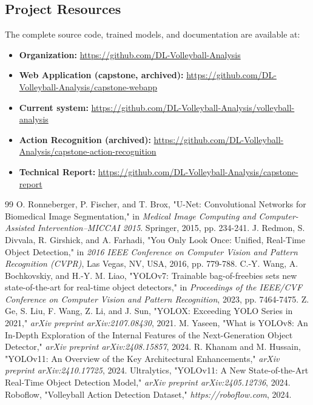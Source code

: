 \documentclass[journal]{IEEEtran}
\begin{document}
\subsection{Project Resources}
The complete source code, trained models, and documentation are available at:
\begin{itemize}
\item \textbf{Organization:} \url{https://github.com/DL-Volleyball-Analysis}
\item \textbf{Web Application (capstone, archived):} \url{https://github.com/DL-Volleyball-Analysis/capstone-webapp}
\item \textbf{Current system:} \url{https://github.com/DL-Volleyball-Analysis/volleyball-analysis}
\item \textbf{Action Recognition (archived):} \url{https://github.com/DL-Volleyball-Analysis/capstone-action-recognition}
\item \textbf{Technical Report:} \url{https://github.com/DL-Volleyball-Analysis/capstone-report}
\end{itemize}

\vspace{0.5cm}

\begin{minipage}[t]{0.48\textwidth}
\begin{thebibliography}{99}
     O. Ronneberger, P. Fischer, and T. Brox, "U-Net: Convolutional Networks for Biomedical Image Segmentation," in \textit{Medical Image Computing and Computer-Assisted Intervention–MICCAI 2015}. Springer, 2015, pp. 234-241.
     J. Redmon, S. Divvala, R. Girshick, and A. Farhadi, "You Only Look Once: Unified, Real-Time Object Detection," in \textit{2016 IEEE Conference on Computer Vision and Pattern Recognition (CVPR)}, Las Vegas, NV, USA, 2016, pp. 779-788.
     C.-Y. Wang, A. Bochkovskiy, and H.-Y. M. Liao, "YOLOv7: Trainable bag-of-freebies sets new state-of-the-art for real-time object detectors," in \textit{Proceedings of the IEEE/CVF Conference on Computer Vision and Pattern Recognition}, 2023, pp. 7464-7475.
     Z. Ge, S. Liu, F. Wang, Z. Li, and J. Sun, "YOLOX: Exceeding YOLO Series in 2021," \textit{arXiv preprint arXiv:2107.08430}, 2021.
     M. Yaseen, "What is YOLOv8: An In-Depth Exploration of the Internal Features of the Next-Generation Object Detector," \textit{arXiv preprint arXiv:2408.15857}, 2024.
     R. Khanam and M. Hussain, "YOLOv11: An Overview of the Key Architectural Enhancements," \textit{arXiv preprint arXiv:2410.17725}, 2024.
     Ultralytics, "YOLOv11: A New State-of-the-Art Real-Time Object Detection Model," \textit{arXiv preprint arXiv:2405.12736}, 2024.
     Roboflow, "Volleyball Action Detection Dataset," \textit{https://roboflow.com}, 2024.
\end{thebibliography}
\end{minipage}
\end{document}

